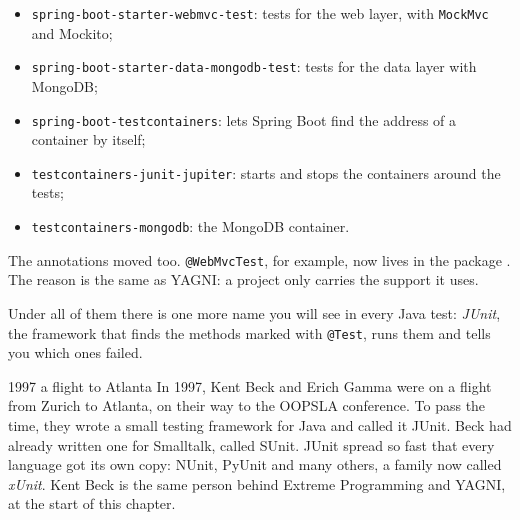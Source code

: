 \begin{itemize}
  \item \texttt{spring-boot-starter-webmvc-test}: tests for the web layer,
        with \texttt{MockMvc} and Mockito;
  \item \texttt{spring-boot-starter-data-mongodb-test}: tests for the data
        layer with MongoDB;
  \item \texttt{spring-boot-testcontainers}: lets Spring Boot find the
        address of a container by itself;
  \item \texttt{testcontainers-junit-jupiter}: starts and stops the
        containers around the tests;
  \item \texttt{testcontainers-mongodb}: the MongoDB container.
\end{itemize}

The annotations moved too. \texttt{@WebMvcTest}, for example, now lives in the
package . The reason
is the same as YAGNI: a project only carries the support it uses.

Under all of them there is one more name you will see in every Java test:
\emph{JUnit}, the framework that finds the methods marked with \texttt{@Test},
runs them and tells you which ones failed.

\begin{history}{1997 \textperiodcentered{} a flight to Atlanta}
In 1997, Kent Beck and Erich Gamma were on a flight from Zurich to Atlanta,
on their way to the OOPSLA conference. To pass the time, they wrote a small
testing framework for Java and called it JUnit. Beck had already written one
for Smalltalk, called SUnit. JUnit spread so fast that every language got its
own copy: NUnit, PyUnit and many others, a family now called \emph{xUnit}.
Kent Beck is the same person behind Extreme Programming and YAGNI, at the
start of this chapter.
\end{history}

